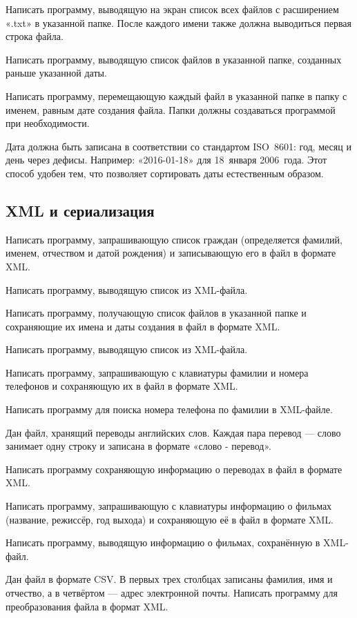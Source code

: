 \task Написать программу, выводящую на экран список всех файлов с
расширением «.txt» в указанной папке. После каждого имени также должна
выводиться первая строка файла.

\task Написать программу, выводящую список файлов в указанной папке,
созданных раньше указанной даты.

\task Написать программу, перемещающую каждый файл в указанной папке в
папку с именем, равным дате создания файла. Папки должны создаваться
программой при необходимости.

Дата должна быть записана в соответствии со стандартом ISO~8601: год,
месяц и день через дефисы. Например: «2016-01-18» для 18~января
2006~года. Этот способ удобен тем, что позволяет сортировать даты
естественным образом.


\subsection{XML и сериализация}

\task Написать программу, запрашивающую список граждан (определяется
фамилий, именем, отчеством и датой рождения) и записывающую его в
файл в формате XML.

Написать программу, выводящую список из XML-файла.

\task Написать программу, получающую список файлов в указанной папке и
сохраняющие их имена и даты создания в файл в формате XML.

Написать программу, выводящую список из XML-файла.

\task Написать программу, запрашивающую с клавиатуры фамилии и номера
телефонов и сохраняющую их в файл в формате XML.

Написать программу для поиска номера телефона по фамилии в XML-файле.

\task Дан файл, хранящий переводы английских слов. Каждая пара перевод
— слово занимает одну строку и записана в формате «слово - перевод».

Написать программу сохраняющую информацию о переводах в файл в формате
XML.

\task Написать программу, запрашивающую с клавиатуры информацию о
фильмах (название, режиссёр, год выхода) и сохраняющую её в файл в
формате XML.

Написать программу, выводящую информацию о фильмах, сохранённую в
XML-файл.

\task Дан файл в формате CSV. В первых трех столбцах записаны фамилия,
имя и отчество, а в четвёртом — адрес электронной почты. Написать
программу для преобразования файла в формат XML.

